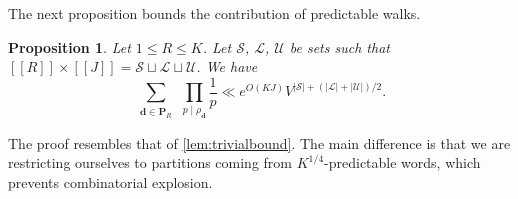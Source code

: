 \documentclass[11pt]{amsart}
\newtheorem{proposition}[theorem]{Proposition}
\theoremstyle{definition}
\renewcommand{\leq}{\leqslant}
\newcommand{\sinterval}[1]{[\![#1]\!] }
\newcommand{\abs}[1]{\left|#1\right|}
\renewcommand{\d}{\boldsymbol{d}}
\newcommand{\curlyL}{V}
\newcommand{\pred}{\mathbf{P}_{\!\tupsize}}
\newcommand{\fprod}[1]{\rho_{#1}}
\newcommand{\pall}{\fprod{\d}}
\newcommand{\lit}{\mathcal{L}}
\newcommand{\unlit}{\mathcal{U}}
\newcommand{\s}{\mathcal{S}}
\newcommand{\repR}{J}
\newcommand{\repK}{K}
\newcommand{\newR}{\sinterval{J}}
\newcommand{\tupsize}{R}
\begin{document}
The next proposition bounds the contribution of predictable walks. 

\begin{proposition}
\label{prop:predictablevector}
Let $1\leq \tupsize\leq \repK$. Let $\s$, $\lit$, $\unlit$ be sets such that $\sinterval{\tupsize}\times \newR = \s\sqcup\lit\sqcup\unlit$. We have
\begin{equation*}
	\sum_{\substack{\d \in \pred}} \, \prod_{p\mid \pall} \frac{1}{p} \ll e^{O(\repK\repR)}\curlyL^{|\s|+(\abs{\lit}+\abs{\unlit})/2}.
\end{equation*}
\end{proposition}

The proof resembles that of \cref{lem:trivialbound}. The main difference is that we are restricting ourselves to partitions coming from $\repK^{1/4}$-predictable words, which prevents combinatorial explosion.
\end{document}
